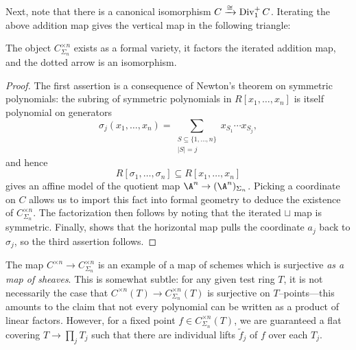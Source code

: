 Next, note that there is a canonical isomorphism $C \xrightarrow{\cong} \operatorname{Div}_1^+ C$.  Iterating the above addition map gives the vertical map in the following triangle:
\begin{center}
\end{center}
\begin{lemma}
The object $C^{\times n}_{\Sigma_n}$ exists as a formal variety, it factors the iterated addition map, and the dotted arrow is an isomorphism.
\end{lemma}
\begin{proof}
The first assertion is a consequence of Newton's theorem on symmetric polynomials: the subring of symmetric polynomials in $R[x_1, \ldots, x_n]$ is itself polynomial on generators \[\sigma_j(x_1, \ldots, x_n) = \sum_{\substack{S \subseteq \{1, \ldots, n\} \\ |S| = j}} x_{S_1} \cdots x_{S_j},\] and hence \[R[\sigma_1, \ldots, \sigma_n] \subseteq R[x_1, \ldots, x_n]\] gives an affine model of the quotient map $\A^n \to (\A^n)_{\Sigma_n}$.  Picking a coordinate on $C$ allows us to import this fact into formal geometry to deduce the existence of $C^{\times n}_{\Sigma_n}$.  The factorization then follows by noting that the iterated $\sqcup$ map is symmetric.  Finally,  shows that the horizontal map pulls the coordinate $a_j$ back to $\sigma_j$, so the third assertion follows.
\end{proof}

\begin{remark}
The map $C^{\times n} \to C^{\times n}_{\Sigma_n}$ is an example of a map of schemes which is surjective \emph{as a map of sheaves}.  This is somewhat subtle: for any given test ring $T$, it is not necessarily the case that $C^{\times n}(T) \to C^{\times n}_{\Sigma_n}(T)$ is surjective on $T$--points---this amounts to the claim that not every polynomial can be written as a product of linear factors.  However, for a fixed point $f \in C^{\times n}_{\Sigma_n}(T)$, we are guaranteed a flat covering $T \to \prod_j T_j$ such that there are individual lifts $\widetilde f_j$ of $f$ over each $T_j$.
\end{remark}

